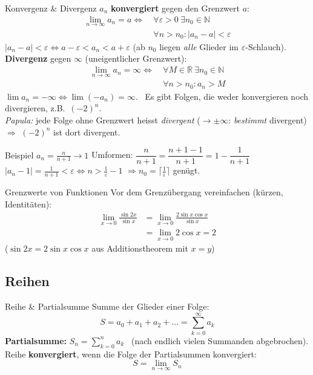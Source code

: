 \documentclass[a4paper, fontsize=7pt]{scrartcl}
\def\N{\mathbb{N}}  %
\def\R{\mathbb{R}}  %
\begin{document}
\begin{mainbox}{Konvergenz \& Divergenz}
$a_n$ \textbf{konvergiert} gegen den Grenzwert $a$:
\begin{align*}
\lim_{n\to\infty} a_n = a \iff\ & \forall \varepsilon > 0\ \exists n_0 \in \N\\
& \forall n > n_0\colon |a_n - a| < \varepsilon
\end{align*}
$|a_n - a| < \varepsilon \iff a - \varepsilon < a_n < a + \varepsilon$
(ab $n_0$ liegen \emph{alle} Glieder im $\varepsilon$-Schlauch).\\[2pt]
\textbf{Divergenz} gegen $\infty$ (uneigentlicher Grenzwert):
\begin{align*}
\lim_{n\to\infty} a_n = \infty \iff\ & \forall M \in \R\ \exists n_0 \in \N\\
& \forall n > n_0\colon a_n > M
\end{align*}
$\lim a_n = -\infty \iff \lim (-a_n) = \infty$. \ Es gibt Folgen, die weder
konvergieren noch divergieren, z.B.\ $(-2)^n$.\\
\emph{Papula:} jede Folge ohne Grenzwert heisst \emph{divergent}
($\to \pm\infty$: \emph{bestimmt} divergent) $\Rightarrow$ $(-2)^n$ ist
dort divergent.
\end{mainbox}

\begin{subbox}{Beispiel $a_n = \frac{n}{n+1} \to 1$}
Umformen: $\dfrac{n}{n+1} = \dfrac{n+1-1}{n+1} = 1 - \dfrac{1}{n+1}$\\
$|a_n - 1| = \frac{1}{n+1} < \varepsilon \iff n > \frac{1}{\varepsilon} - 1$
$\Rightarrow n_0 = \lceil \frac{1}{\varepsilon} \rceil$ genügt.
\end{subbox}

\begin{subbox}{Grenzwerte von Funktionen}
Vor dem Grenzübergang vereinfachen (kürzen, Identitäten):
\begin{align*}
\lim_{x\to0} \frac{\sin 2x}{\sin x}
&= \lim_{x\to0} \frac{2\sin x\cos x}{\sin x}\\
&= \lim_{x\to0} 2\cos x = 2
\end{align*}
($\sin 2x = 2\sin x \cos x$ aus Additionstheorem mit $x = y$)
\end{subbox}

\subsection{Reihen}

\begin{mainbox}{Reihe \& Partialsumme}
Summe der Glieder einer Folge:
$$S = a_0 + a_1 + a_2 + \ldots = \sum_{k=0}^{\infty} a_k$$
\textbf{Partialsumme:} $S_n = \sum_{k=0}^{n} a_k$ \ (nach endlich vielen
Summanden abgebrochen).\\
Reihe \textbf{konvergiert}, wenn die Folge der Partialsummen konvergiert:
$$\boxed{S = \lim_{n\to\infty} S_n}$$
\end{mainbox}
\end{document}
